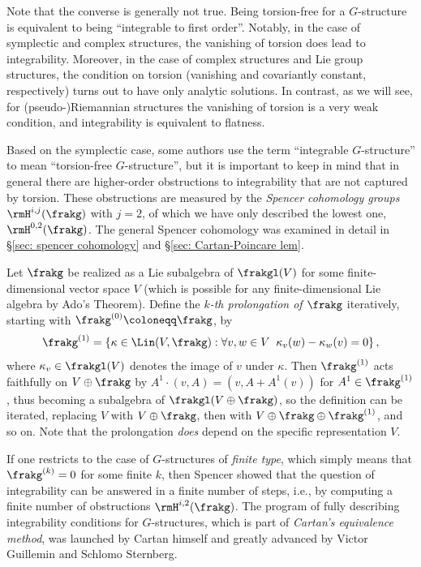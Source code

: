 \begin{rem}
    Note that the converse is generally not true. Being torsion-free for a $G$-structure is equivalent to being ``integrable to first order''. Notably, in the case of symplectic and complex structures, the vanishing of torsion does lead to integrability. Moreover, in the case of complex structures and Lie group structures, the condition on torsion (vanishing and covariantly constant, respectively) turns out to have only analytic solutions. In contrast, as we will see, for (pseudo-)Riemannian structures the vanishing of torsion is a very weak condition, and integrability is equivalent to flatness. 
    
    Based on the symplectic case, some authors use the term ``integrable $G$-structure'' to mean ``torsion-free $G$-structure'', but it is important to keep in mind that in general there are higher-order obstructions to integrability that are not captured by torsion. These obstructions are measured by the \emph{Spencer cohomology groups} $\rmH^{i,j}(\frakg)$ with $j=2$, of which we have only described the lowest one, $\rmH^{0,2}(\frakg)$.  The general Spencer cohomology was examined in detail in \S\ref{sec: spencer cohomology} and \S\ref{sec: Cartan-Poincare lem}.

    Let $\frakg$ be realized as a Lie subalgebra of $\frakgl(V)$ for some finite-dimensional vector space $V$ (which is possible for any finite-dimensional Lie algebra by Ado's Theorem). Define the \emph{$k$-th prolongation of $\frakg$} iteratively, starting with $\frakg^{(0)}\coloneqq \frakg$, by
    \[\frakg^{(1)}=\left\{\kappa \in\Lin(V,\frakg):\forall v,w\in V\;\; \kappa_v(w)-\kappa_w(v)=0\right\},\]
    where $\kappa_v\in\frakgl(V)$ denotes the image of $v$ under $\kappa$. Then $\frakg^{(1)}$ acts faithfully on $V\oplus\frakg$ by $A^1\cdot (v,A)=(v,A+A^1(v))$ for $A^1\in\frakg^{(1)}$, thus becoming a subalgebra of $\frakgl(V\oplus\frakg)$, so the definition can be iterated, replacing $V$ with $V\oplus\frakg$, then with $V\oplus\frakg\oplus\frakg^{(1)}$, and so on. Note that the prolongation \emph{does} depend on the specific representation $V$. 
    
    If one restricts to the case of $G$-structures of \emph{finite type}, which simply means that $\frakg^{(k)}=0$ for some finite $k$, then Spencer showed that the question of integrability can be answered in a finite number of steps, i.e., by computing a finite number of obstructions $\rmH^{i,2}(\frakg)$. The program of fully describing integrability conditions for $G$-structures, which is part of \emph{Cartan's equivalence method}, was launched by Cartan himself and greatly advanced by Victor Guillemin and Schlomo Sternberg.
\end{rem}

